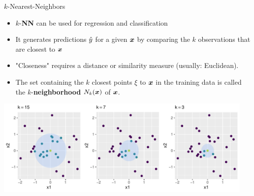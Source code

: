 \documentclass[11pt,compress,t,notes=noshow, xcolor=table]{beamer}
\newenvironment{knitrout}{}{} %
\begin{document}
\begin{vbframe}{$k$-Nearest-Neighbors}

\begin{itemize}
\item $k$-\textbf{NN} can be used for regression and classification
\item It generates predictions $\hat{y}$ for a given $\bm{x}$ by comparing the $k$ observations that are closest to $\bm{x}$
\item "Closeness" requires a distance or similarity measure (usually: Euclidean).
\item The set containing the $k$ closest points $\xi$ to $\bm{x}$ in the training data is called  the $k$-\textbf{neighborhood} $N_k(\bm{x})$ of $\bm{x}$.
\end{itemize}


\begin{knitrout}\scriptsize
{}\color{fgcolor}

{\centering \includegraphics[width=0.95\textwidth]{figure/reg_knn_1} 

}



\end{knitrout}

\end{vbframe}
\end{document}
